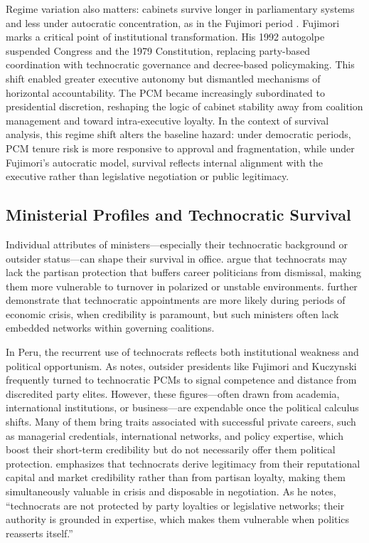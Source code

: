 \documentclass[a4paper, 12pt]{article}
\begin{document}
Regime variation also matters: cabinets survive longer in parliamentary systems and less under autocratic concentration, as in the Fujimori period \citep{perez-linan_presidential_2007, garcia_marin_fragmentacion_2024}. Fujimori marks a critical point of institutional transformation. His 1992 autogolpe suspended Congress and the 1979 Constitution, replacing party-based coordination with technocratic governance and decree-based policymaking. This shift enabled greater executive autonomy but dismantled mechanisms of horizontal accountability. The PCM became increasingly subordinated to presidential discretion, reshaping the logic of cabinet stability away from coalition management and toward intra-executive loyalty. In the context of survival analysis, this regime shift alters the baseline hazard: under democratic periods, PCM tenure risk is more responsive to approval and fragmentation, while under Fujimori's autocratic model, survival reflects internal alignment with the executive rather than legislative negotiation or public legitimacy.


\subsection{Ministerial Profiles and Technocratic Survival}

Individual attributes of ministers—especially their technocratic background or outsider status—can shape their survival in office. \citet{escobar-lemmon_coming_2010} argue that technocrats may lack the partisan protection that buffers career politicians from dismissal, making them more vulnerable to turnover in polarized or unstable environments. \citet{alexiadou_commitment_2019} further demonstrate that technocratic appointments are more likely during periods of economic crisis, when credibility is paramount, but such ministers often lack embedded networks within governing coalitions.

In Peru, the recurrent use of technocrats reflects both institutional weakness and political opportunism. As \citet{carreras_presidentes_2013} notes, outsider presidents like Fujimori and Kuczynski frequently turned to technocratic PCMs to signal competence and distance from discredited party elites. However, these figures—often drawn from academia, international institutions, or business—are expendable once the political calculus shifts. Many of them bring traits associated with successful private careers, such as managerial credentials, international networks, and policy expertise, which boost their short-term credibility but do not necessarily offer them political protection. \citet[pp.~45--48]{dargent_technocracy_2014} emphasizes that technocrats derive legitimacy from their reputational capital and market credibility rather than from partisan loyalty, making them simultaneously valuable in crisis and disposable in negotiation. As he notes, ``technocrats are not protected by party loyalties or legislative networks; their authority is grounded in expertise, which makes them vulnerable when politics reasserts itself.''
\end{document}
